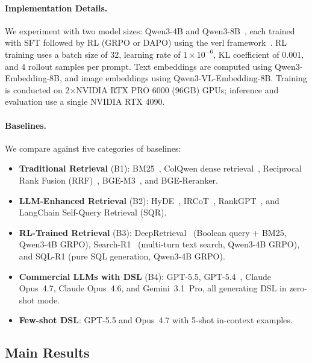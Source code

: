\documentclass[11pt]{article}
\begin{document}
\paragraph{Implementation Details.}
We experiment with two model sizes: Qwen3-4B and Qwen3-8B~\cite{yang2025qwen3}, each trained with SFT followed by RL (GRPO or DAPO) using the verl framework~\cite{sheng2024hybridflow}.
RL training uses a batch size of 32, learning rate of $1 \times 10^{-6}$, KL coefficient of 0.001, and 4 rollout samples per prompt.
Text embeddings are computed using Qwen3-Embedding-8B, and image embeddings using Qwen3-VL-Embedding-8B.
Training is conducted on 2$\times$NVIDIA RTX PRO 6000 (96GB) GPUs; inference and evaluation use a single NVIDIA RTX 4090.

\paragraph{Baselines.}
We compare against five categories of baselines:

\begin{itemize}[leftmargin=*,nosep]
\item \textbf{Traditional Retrieval} (B1): BM25~\cite{robertson2009probabilistic}, ColQwen dense retrieval~\cite{chen2024colqwen}, Reciprocal Rank Fusion (RRF)~\cite{cormack2009reciprocal}, BGE-M3~\cite{chen2024bge}, and BGE-Reranker.
\item \textbf{LLM-Enhanced Retrieval} (B2): HyDE~\cite{gao2023precise}, IRCoT~\cite{trivedi2023interleaving}, RankGPT~\cite{sun2023chatgpt}, and LangChain Self-Query Retrieval (SQR).
\item \textbf{RL-Trained Retrieval} (B3): DeepRetrieval~\cite{jiang2025deepretrieval} (Boolean query + BM25, Qwen3-4B GRPO), Search-R1~\cite{jin2025search} (multi-turn text search, Qwen3-4B GRPO), and SQL-R1 (pure SQL generation, Qwen3-4B GRPO).
\item \textbf{Commercial LLMs with DSL} (B4): GPT-5.5, GPT-5.4~\cite{openai2025gpt5}, Claude Opus~4.7, Claude Opus~4.6, and Gemini~3.1~Pro, all generating DSL in zero-shot mode.
\item \textbf{Few-shot DSL}: GPT-5.5 and Opus~4.7 with 5-shot in-context examples.
\end{itemize}


\subsection{Main Results}
\label{sec:main_results}
\end{document}
